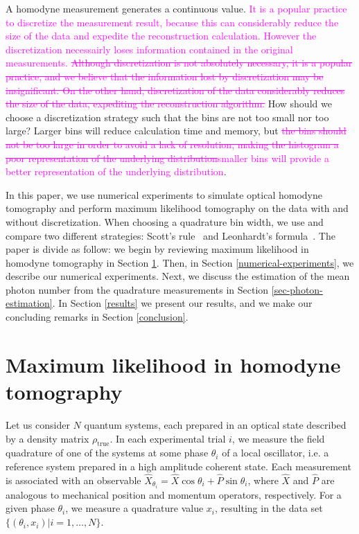 \documentclass[
reprint,
superscriptaddress,
showpacs,
amsmath,
amssymb,
aps,
pra,
longbibliography
]{revtex4-1}
\providecommand{\aucmnt}[1]{#1}
\providecommand{\editcolor}[2]{\textcolor{#1}{#2}}
\providecommand{\aucmnt}[1]{}
\providecommand{\editcolor}[2]{#2}
\newcommand{\SG}[1]{\editcolor{magenta}{#1}}
\newcommand{\SGs}[1]{\aucmnt{\editcolor{magenta}{\sout{#1}}}}
\newcommand{\rhotrue}{\rho_{\text{true}}}
\begin{document}
A homodyne measurement generates a continuous value.  \SG{It is a
  popular practice to discretize the measurement result, because this
  can considerably reduce the size of the data and expedite the
  reconstruction calculation.  However the discretization necessairly
  loses information contained in the original measurements.}
\SGs{Although discretization is not absolutely necessary, it is a
  popular practice, and we believe that the information lost by
  discretization may be insignificant. On the other hand,
  discretization of the data considerably reduces the size of the
  data, expediting the reconstruction algorithm.} How should we choose
a discretization strategy such that the bins are not too small nor too
large? Larger bins will reduce calculation time and memory, but
\SGs{the bins should not be too large in order to avoid a lack of
  resolution, making the histogram a poor representation of the
  underlying distribution}\SG{smaller bins will provide a better
  representation of the underlying distribution}.
 
In this paper, we use numerical experiments to simulate optical
homodyne tomography and perform maximum likelihood tomography on the
data with and without discretization. When choosing a quadrature bin
width, we use and compare two different strategies: Scott's
rule~\cite{Scott2010} and Leonhardt's formula~\cite{Leonhardt1996}.
The paper is divide as follow: we begin by reviewing maximum
likelihood in homodyne tomography in Section \ref{MLE}. Then, in
Section \ref{numerical-experiments}, we describe our numerical
experiments. Next, we discuss the estimation of the mean photon number
from the quadrature measurements in Section
\ref{sec-photon-estimation}. In Section \ref{results} we present our
results, and we make our concluding remarks in Section
\ref{conclusion}.

\section{Maximum likelihood in homodyne tomography}
\label{MLE}
Let us consider $N$ quantum systems, each prepared in an
optical state described by a density matrix $\rhotrue$. In each
experimental trial $i$, we measure the field quadrature
of one of the systems at some phase $\theta_i$ of a local oscillator, 
i.e. a reference system prepared in a high amplitude coherent state. 
Each measurement is associated with an observable
$\hat{X}_{\theta_i} = \hat{X} \cos \theta_i + \hat{P} \sin \theta_i$,
where $\hat{X}$ and $\hat{P}$ are analogous to mechanical position and 
momentum operators, respectively. For a given phase $\theta_i$, we 
measure a quadrature value $x_i$, resulting in the 
data set $\{(\theta_i, x_i)| i = 1, \ldots, N\}$.
\end{document}
